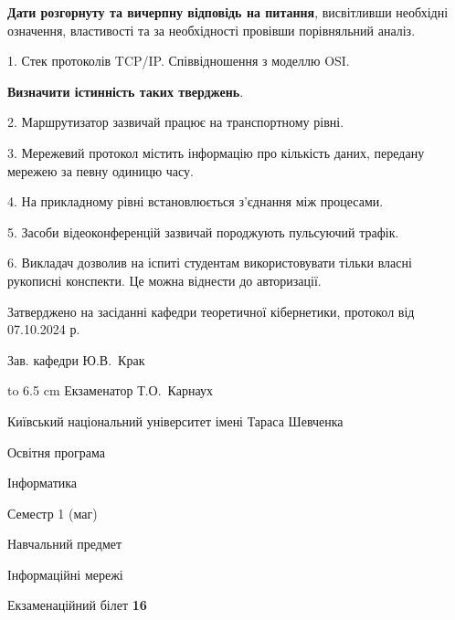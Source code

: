 \documentclass[12pt, ukrainian]{article}
\begin{document}
{
\qquad\textbf{Дати розгорнуту та вичерпну відповідь на питання}, висвітливши необхідні означення, властивості та за необхідності провівши порівняльний аналіз.

1. Стек протоколів TCP/IP. Співвідношення з моделлю OSI.



\qquad\textbf{Визначити істинність таких тверджень}.

2. Маршрутизатор зазвичай працює на транспортному рівні.


3. Мережевий протокол містить інформацію про кількість даних, передану мережею за певну одиницю часу.


4. На прикладному рівні встановлюється з'єднання між процесами.


5. Засоби відеоконференцій зазвичай породжують пульсуючий трафік.


6. Викладач дозволив на іспиті студентам використовувати тільки власні рукописні конспекти. Це можна віднести до авторизації.

}
{\smallskip\smallskip \begin {scriptsize} Затверджено на засіданні кафедри теоретичної кібернетики, протокол   від   07.10.2024 р.\par\smallskip\smallskip\smallskip\smallskip
{\parbox {6.5 cm} {Зав. кафедри \dotfill Ю.В.~Крак}}\hspace {0.7cm} {\hbox to 6.5 cm { Екзаменатор \dotfill Т.О.~Карнаух}} \end{scriptsize}}
\newpage
{{\begin {scriptsize}\par
{ \center  Київський національний університет імені Тараса Шевченка \par}
{\parbox {5 cm}{Освітня програма \hfill}{\parbox {7 cm}{Інформатика\hfill}}\parbox {6 cm}{\hfill Семестр 1 (маг)}}\par
{\parbox {5 cm} {Навчальний предмет \hfill}\parbox {7 cm}{Інформаційні мережі \hfill}\parbox {6cm}{\hfill}\par}\vspace{-15pt} \end{scriptsize}}{\center Екзаменаційний білет \No \textbf { 16 }\par}}
\end{document}
